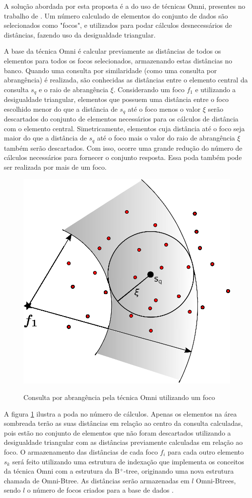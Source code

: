 A solução abordada por esta proposta é a do uso de técnicas Omni, presentes no trabalho de \cite{Traina2001}. Um número calculado de elementos do conjunto de dados são selecionados como "focos", e utilizados para
podar cálculos desnecessários de distâncias, fazendo uso da desigualdade triangular. 

A base da técnica Omni é calcular previamente as distâncias de todos os elementos para todos os focos selecionados, armazenando estas distâncias no banco. Quando uma consulta por similaridade
(como uma consulta por abrangência) é realizada, são conhecidas as distâncias entre o elemento central da consulta $s_q$ e o raio de abrangência $\xi$. Considerando um foco ${f_1}$ e utilizando
a desigualdade triangular, elementos que possuem uma distância entre o foco escolhido menor do que a distância de $s_q$ até o foco menos o valor $\xi$ serão descartados do conjunto de elementos necessários para
os cálculos de distância com o elemento central. Simetricamente, elementos cuja distância até o foco seja maior do que a distância de $s_q$ até o foco mais o valor do raio de abrangência $\xi$ também
serão descartados. Com isso, ocorre uma grande redução do número de cálculos necessários para fornecer o conjunto resposta. Essa poda também pode ser realizada por mais de um foco.

\begin{figure}[H]
\centering
\caption{Consulta por abrangência pela técnica Omni utilizando um foco}
\includegraphics[width=.4\textwidth]{dados/figuras/rg_omni_1.eps}
\label{fig:rqomni1}
\end{figure}


A figura \ref{fig:rqomni1} ilustra a poda no número de cálculos. Apenas os elementos na área sombreada terão as suas distâncias em relação ao centro da consulta calculadas, pois estão no
conjunto de elementos que não foram descartados utilizando a desigualdade triangular com as distâncias previamente calculadas em relação ao foco. O armazenamento das distâncias de cada foco ${f_i}$ para cada outro elemento $s_k$ será feito 
utilizando uma estrutura de indexação que implementa os conceitos da técnica Omni com a estrutura da B$^+$-tree, originando uma nova estrutura chamada de Omni-Btree. As distâncias serão armazenadas em $l$ Omni-Btrees, sendo $l$ o número de focos
criados para a base de dados \cite{Traina2001}.

